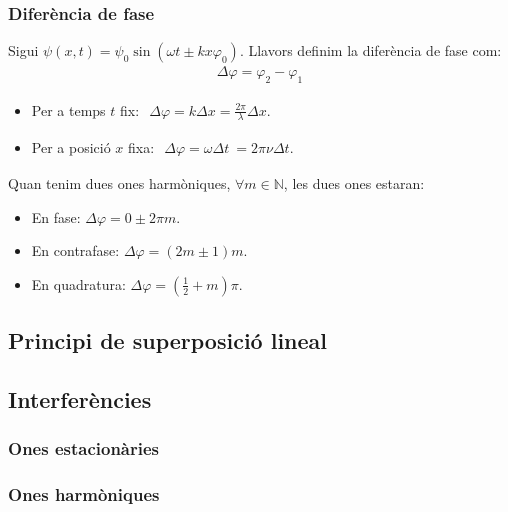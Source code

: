 \subsubsection*{Diferència de fase}
Sigui $\psi (x,t) = \psi_{0} \sin (\omega t \pm kx \varphi_{0})$. Llavors definim la diferència de fase com:
\begin{align}
    \boxed{\Delta \varphi = \varphi_{2} - \varphi_{1}}
\end{align}
\begin{itemize}
    \item Per a temps $t$ fix:
        $\begin{gathered} \boxed{\Delta \varphi = k \Delta x = \frac{2 \pi}{\lambda} \Delta x}. \end{gathered}$
    \item Per a posició $x$ fixa:
        $\begin{gathered} \boxed{\Delta \varphi = \omega \Delta t \ = 2 \pi \nu \Delta t}. \end{gathered}$
\end{itemize}
Quan tenim dues ones harmòniques, $\forall m \in \mathbb{N}$, les dues ones estaran:
\begin{itemize}
    \item En fase: $\boxed{\Delta \varphi = 0 \pm 2 \pi m}$.
    \item En contrafase: $\boxed{\Delta \varphi = (2m \pm 1) m}$.
    \item En quadratura: $\boxed{\Delta \varphi = (\frac{1}{2} + m) \pi}$.
\end{itemize}

\subsection{Principi de superposició lineal}

\subsection{Interferències}
\subsubsection*{Ones estacionàries}
\subsubsection*{Ones harmòniques}
